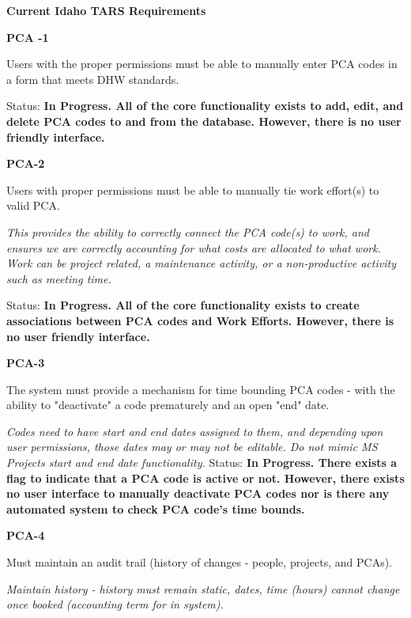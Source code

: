 \documentclass{article}
\begin{document}

\noindent \textbf{Current Idaho TARS Requirements}

\noindent 

\noindent \textbf{PCA -1}

\noindent Users with the proper permissions must be able to manually enter PCA codes in a form that meets DHW standards.

\noindent Status: \textbf{In Progress.  All of the core functionality exists to add, edit, and delete PCA codes to and from the database.  However, there is no user friendly interface.}

\noindent \textbf{}

\noindent \textbf{PCA-2}

\noindent Users with proper permissions must be able to manually tie work effort(s) to valid PCA.

\noindent \textit{This provides the ability to correctly connect the PCA code(s) to work, and ensures we are correctly accounting for what costs are allocated to what work. Work can be project related, a maintenance activity, or a non-productive activity such as meeting time.}

Status: \textbf{In Progress.  All of the core functionality exists to create associations between PCA codes and Work Efforts.  However, there is no user friendly interface.}



\noindent \textbf{PCA-3}

\noindent The system must provide a mechanism for time bounding PCA codes - with the ability to "deactivate" a code prematurely and an open "end" date.

\noindent \textit{Codes need to have start and end dates assigned to them, and depending upon user permissions, those dates may or may not be editable. Do not mimic MS Projects start and end date functionality.}
\noindent Status: \textbf{In Progress.  There exists a flag to indicate that a PCA code is active or not.  However, there exists no user interface to manually deactivate PCA codes nor is there any automated system to check PCA code's time bounds.}



\noindent \textbf{PCA-4}

\noindent Must maintain an audit trail (history of changes - people, projects, and PCAs).

\noindent \textit{Maintain history - history must remain static, dates, time (hours) cannot change once booked (accounting term for in system).}
\end{document}
